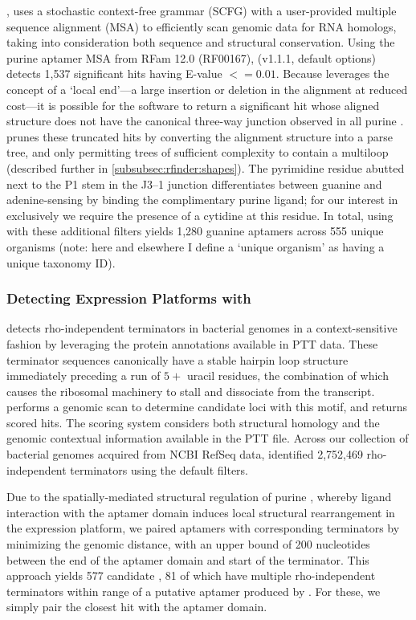 \infernal \citep{infernal}, \citep{nawrocki:2013hk} uses a stochastic context-free
grammar (SCFG) with a user-provided multiple sequence alignment (MSA) to
efficiently scan genomic data for RNA homologs, taking into consideration both
sequence and structural conservation. Using the purine aptamer MSA from RFam 12.0
(RF00167), \infernal (v1.1.1, default options) detects 1,537 significant hits
having E-value $<= 0.01$. Because \infernal leverages the concept of a
`local end'---a large insertion or deletion in the alignment at reduced cost---it
is possible for the software to return a significant hit whose aligned structure
does not have the canonical three-way junction observed in all purine
\rbs. \rfinder prunes these truncated \infernal hits by converting the
alignment structure into a parse tree, and only permitting trees of sufficient
complexity to contain a multiloop (described further in
\ref{subsubsec:rfinder:shapes}). The pyrimidine residue abutted next to the P1
stem in the J3--1 junction differentiates between guanine and adenine-sensing
\rbs by binding the complimentary purine ligand; for our interest in \grbs
exclusively we require the presence of a cytidine at this residue. In total, using
\infernal with these additional filters yields 1,280 guanine aptamers across 555
unique organisms (note: here and elsewhere I define a `unique organism' as having
a unique taxonomy ID).

\subsubsection{Detecting Expression Platforms with \tthp}
\label{subsubsec:rfinder:tthp}

\tthp \citep{ermolaeva:2000cl} detects rho-independent terminators in bacterial
genomes in a context-sensitive fashion by leveraging the protein annotations
available in PTT data. These terminator sequences canonically have a stable
hairpin loop structure immediately preceding a run of $5+$ uracil residues, the
combination of which causes the ribosomal machinery to stall and dissociate from
the transcript. \tthp performs a genomic scan to determine candidate loci with
this motif, and returns scored hits. The scoring system considers both structural
homology and the genomic contextual information available in the PTT file. Across
our collection of bacterial genomes acquired from NCBI RefSeq data, \tthp
identified 2,752,469 rho-independent terminators using the default filters.

Due to the spatially-mediated structural regulation of purine \rbs,
whereby ligand interaction with the aptamer domain induces local structural
rearrangement in the expression platform, we paired aptamers with corresponding
terminators by minimizing the genomic distance, with an upper bound of 200
nucleotides between the end of the aptamer domain and start of the terminator.
This approach yields 577 candidate \rbs, 81 of which have multiple
rho-independent terminators within range of a putative aptamer produced by
\infernal. For these, we simply pair the closest \tthp hit with the aptamer domain.

